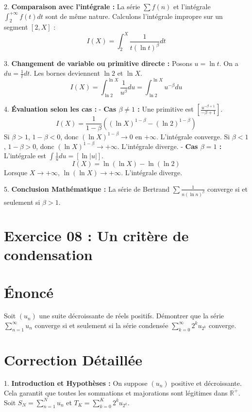 \documentclass[12pt, a4paper]{article}
\begin{document}
2. \textbf{Comparaison avec l'intégrale :}
   La série $\sum f(n)$ et l'intégrale $\int_2^{+\infty} f(t)dt$ sont de même nature.
   Calculons l'intégrale impropre sur un segment $[2, X]$ :
   $$I(X) = \int_2^X \frac{1}{t (\ln t)^\beta} dt$$

3. \textbf{Changement de variable ou primitive directe :}
   Posons $u = \ln t$. On a $du = \frac{1}{t} dt$.
   Les bornes deviennent $\ln 2$ et $\ln X$.
   $$I(X) = \int_{\ln 2}^{\ln X} \frac{1}{u^\beta} du = \int_{\ln 2}^{\ln X} u^{-\beta} du$$

4. \textbf{Évaluation selon les cas :}
   - \textbf{Cas $\beta \neq 1$ :}
     Une primitive est $\left[\frac{u^{-\beta+1}}{-\beta+1}\right]$.
     $$I(X) = \frac{1}{1-\beta} \left( (\ln X)^{1-\beta} - (\ln 2)^{1-\beta} \right)$$
     Si $\beta > 1$, $1-\beta < 0$, donc $(\ln X)^{1-\beta} \to 0$ en $+\infty$. L'intégrale converge.
     Si $\beta < 1$, $1-\beta > 0$, donc $(\ln X)^{1-\beta} \to +\infty$. L'intégrale diverge.
   - \textbf{Cas $\beta = 1$ :}
     L'intégrale est $\int \frac{1}{u} du = [\ln |u|]$.
     $$I(X) = \ln(\ln X) - \ln(\ln 2)$$
     Lorsque $X \to +\infty$, $\ln(\ln X) \to +\infty$. L'intégrale diverge.

5. \textbf{Conclusion Mathématique :}
   La série de Bertrand $\sum \frac{1}{n (\ln n)^\beta}$ converge si et seulement si $\beta > 1$.


\section*{Exercice 08 : Un critère de condensation}

\section{Énoncé}
Soit $(u_n)$ une suite décroissante de réels positifs. Démontrer que la série $\sum_{n=1}^\infty u_n$ converge si et seulement si la série condensée $\sum_{k=0}^\infty 2^k u_{2^k}$ converge.

\section{Correction Détaillée}
1. \textbf{Introduction et Hypothèses :}
   On suppose $(u_n)$ positive et décroissante. Cela garantit que toutes les sommations et majorations sont légitimes dans $\overline{\mathbb{R}^+}$.
   Soit $S_N = \sum_{n=1}^N u_n$ et $T_K = \sum_{k=0}^K 2^k u_{2^k}$.
\end{document}
